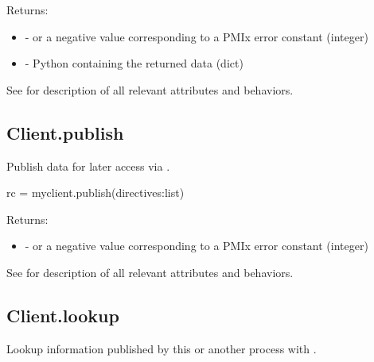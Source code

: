 Returns:

\begin{itemize}
    \item {} -  or a negative value corresponding to a PMIx error constant (integer)
    \item {} - Python  containing the returned data (dict)
\end{itemize}

See  for description of all relevant attributes and behaviors.


\subsection{Client.publish}

\summary

Publish data for later access via .

\format

\pyspecificstart
\begin{codepar}
rc = myclient.publish(directives:list)
\end{codepar}
\pyspecificend

\begin{arglist}
\end{arglist}

Returns:

\begin{itemize}
    \item {} -  or a negative value corresponding to a PMIx error constant (integer)
\end{itemize}

See  for description of all relevant attributes and behaviors.


\subsection{Client.lookup}

\summary

Lookup information published by this or another process with .

